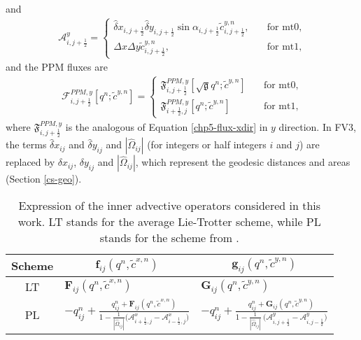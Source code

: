 and
\begin{align}
	\label{ay-def}
	\mathcal{A}_{i,j+\frac{1}{2}}^y= 
	\begin{cases}
		\hat{\delta} x_{i,j+\frac{1}{2}}  \hat{\delta} y_{i,j+\frac{1}{2}} 
		\sin{\alpha_{i,j+\frac{1}{2}}}
		{\tilde{c}}_{i,j+\frac{1}{2}}^{y,n},
		\quad &\text{for mt0},\\
		{\Delta x}{\Delta y}{\tilde{c}}_{i,j+\frac{1}{2}}^{y,n},
		\quad &\text{for mt1},
	\end{cases}
\end{align}
and the PPM fluxes are
\begin{align}
	\label{ppmy-flux} 
	\mathcal{F}_{i,j+\frac{1}{2}}^{PPM,y} [{{q}^n;\tilde{c}^{y,n}}]= 
	\begin{cases}
		\mathfrak{F}_{i,j+\frac{1}{2}}^{PPM,y}[{{\sqrt{\mathfrak{g}}q}^n;\tilde{c}^{y,n}}]
		\quad &\text{for mt0},\\
		\mathfrak{F}_{i+\frac{1}{2},j}^{PPM,y}[{{q}^n;\tilde{c}^{y,n}}]
		\quad &\text{for mt1},
	\end{cases}
\end{align}
where $\mathfrak{F}_{i,j+\frac{1}{2}}^{PPM,y}$ is the analogous of Equation \eqref{chp5-flux-xdir} in $y$ direction.
In FV3, the terms ${\hat{\delta} x_{ij}}$ and ${\hat{\delta} y_{ij}}$ and $|\hat{\Omega}_{ij}|$ (for integers or half integers $i$ and $j$)
are replaced by ${{\delta} x_{ij}}$, ${{\delta} y_{ij}}$ and $|\hat{\Omega}_{ij}|$,
which represent the geodesic distances and areas (Section \ref{cs-geo}).
\begin{table}[!h]
	\begin{tabular}{|c|l|l|}
		\hline
		Scheme & \multicolumn{1}{c|}{$\mathbf{f}_{ij}(q^n, \tilde{c}^{x,n})$}
		& \multicolumn{1}{c|}{$\mathbf{g}_{ij}(q^n, \tilde{c}^{y,n})$} \\ \hline
		LT   & $\mathbf{F}_{ij}(q^n,\tilde{c}^{x,n})$ 
		& $\mathbf{G}_{ij}(q^n,\tilde{c}^{y,n})$ \\ \hline
		PL   & $-q_{ij}^n +
		\frac{q_{ij}^n  + \mathbf{F}_{ij}(q^n,\tilde{c}^{x,n})}
		{1 - \frac{1}{|\hat{\Omega}_{ij}|}\big(\mathcal{A}_{i+\frac{1}{2},j}^{x} - \mathcal{A}_{i-\frac{1}{2},j}^{x}\big)}$
		& $-q_{ij}^n +
		\frac{q_{ij}^n  + \mathbf{G}_{ij}(q^n,\tilde{c}^{y,n})}
		{1 - \frac{1}{|\hat{\Omega}_{ij}|}\ \big(\mathcal{A}_{i,j+\frac{1}{2}}^{y} - \mathcal{A}_{i,j-\frac{1}{2}}^{y}\big)}$
		\\ \hline
	\end{tabular}
	\caption{Expression of the inner advective operators considered in this work.
		LT stands for the average Lie-Trotter  scheme, while PL stands for the scheme from \citet{putman:2007}.}
	\label{chp-csfv-tab1}
\end{table}

